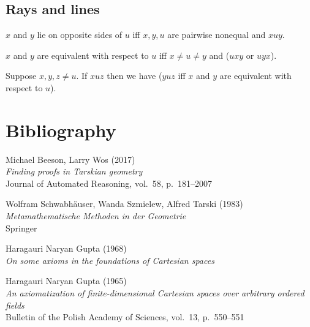 \documentclass[10pt,a4paper,parskip=half,numbers=endperiod,headings=standardclasses,parskip]{scrbook}
\newcommand{\Betw}[3]{#1 #2 #3}
\begin{document}
  \section{Rays and lines}

  \begin{forthel}
    \begin{definition}
      $x$ and $y$ lie on opposite sides of $u$ iff
      $x, y, u$ are pairwise nonequal and $\Betw{x}{u}{y}$.
    \end{definition}

    \begin{definition}
      $x$ and $y$ are equivalent with respect to $u$ iff $x\neq u \neq y$ and ($\Betw{u}{x}{y}$ or $\Betw{u}{y}{x}$).
    \end{definition}

    \begin{lemma}
      Suppose $x,y,z \neq u$.
      If $\Betw{x}{u}{z}$
      then we have
        ($\Betw{y}{u}{z}$ iff $x$ and $y$ are equivalent with respect to $u$).
    \end{lemma}
  \end{forthel}

  \appendix
  \chapter*{Bibliography}

  Michael Beeson, Larry Wos (2017)
  \\ \textit{Finding proofs in Tarskian geometry}
  \\ Journal of Automated Reasoning, vol.~58, p.~181--2007

  Wolfram Schwabhäuser, Wanda Szmielew, Alfred Tarski (1983)
  \\ \textit{Metamathematische Methoden in der Geometrie}
  \\ Springer

  Haragauri Naryan Gupta (1968)
  \\ \textit{On some axioms in the foundations of Cartesian spaces}

  Haragauri Naryan Gupta (1965)
  \\ \textit{An axiomatization of finite-dimensional Cartesian spaces over arbitrary ordered fields}
  \\ Bulletin of the Polish Academy of Sciences, vol.~13, p.~550--551

\end{document}
